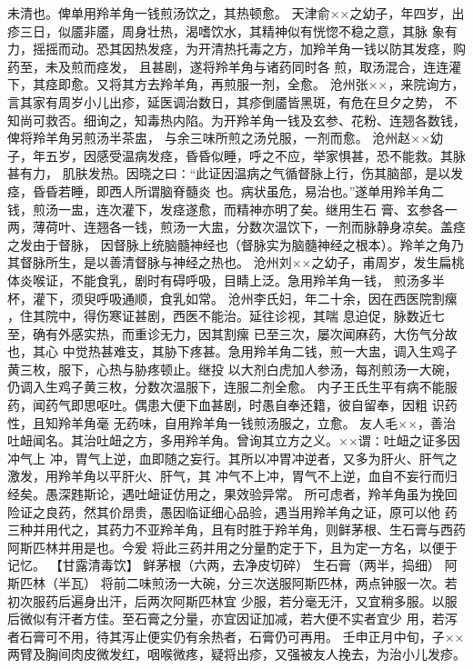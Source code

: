\documentclass[a4paper,12pt,UTF8,twoside]{ctexbook}
\begin{document}
未清也。俾单用羚羊角一钱煎汤饮之，其热顿愈。 
天津俞××之幼子，年四岁，出疹三日，似靥非靥，周身壮热，渴嗜饮水，其精神似有恍惚不稳之意，其脉 
象有力，摇摇而动。恐其因热发痉，为开清热托毒之方，加羚羊角一钱以防其发痉，购药至，未及煎而痉发， 
且甚剧，遂将羚羊角与诸药同时各 
煎，取汤混合，连连灌下，其痉即愈。又将其方去羚羊角，再煎服一剂，全愈。 
沧州张××，来院询方，言其家有周岁小儿出疹，延医调治数日，其疹倒靥皆黑斑，有危在旦夕之势， 
不知尚可救否。细询之，知毒热内陷。为开羚羊角一钱及玄参、花粉、连翘各数钱，俾将羚羊角另煎汤半茶盅， 
与余三味所煎之汤兑服，一剂而愈。 
沧州赵××幼子，年五岁，因感受温病发痉，昏昏似睡，呼之不应，举家惧甚，恐不能救。其脉甚有力， 
肌肤发热。因晓之曰∶“此证因温病之气循督脉上行，伤其脑部，是以发痉，昏昏若睡，即西人所谓脑脊髓炎 
也。病状虽危，易治也。”遂单用羚羊角二钱，煎汤一盅，连次灌下，发痉遂愈，而精神亦明了矣。继用生石 
膏、玄参各一两，薄荷叶、连翘各一钱，煎汤一大盅，分数次温饮下，一剂而脉静身凉矣。盖痉之发由于督脉， 
因督脉上统脑髓神经也（督脉实为脑髓神经之根本）。羚羊之角乃其督脉所生，是以善清督脉与神经之热也。 
沧州刘××之幼子，甫周岁，发生扁桃体炎喉证，不能食乳，剧时有碍呼吸，目睛上泛。急用羚羊角一钱， 
煎汤多半杯，灌下，须臾呼吸通顺，食乳如常。 
沧州李氏妇，年二十余，因在西医院割瘰 ，住其院中，得伤寒证甚剧，西医不能治。延往诊视，其喘 
息迫促，脉数近七至，确有外感实热，而重诊无力，因其割瘰 已至三次，屡次闻麻药，大伤气分故也，其心 
中觉热甚难支，其胁下疼甚。急用羚羊角二钱，煎一大盅，调入生鸡子黄三枚，服下，心热与胁疼顿止。继投 
以大剂白虎加人参汤，每剂煎汤一大碗，仍调入生鸡子黄三枚，分数次温服下，连服二剂全愈。 
内子王氏生平有病不能服药，闻药气即思呕吐。偶患大便下血甚剧，时愚自奉还籍，彼自留奉，因粗 
识药性，且知羚羊角毫 
无药味，自用羚羊角一钱煎汤服之，立愈。 
友人毛××，善治吐衄闻名。其治吐衄之方，多用羚羊角。曾询其立方之义。××谓∶吐衄之证多因冲气上 
冲，胃气上逆，血即随之妄行。其所以冲胃冲逆者，又多为肝火、肝气之激发，用羚羊角以平肝火、肝气，其 
冲气不上冲，胃气不上逆，血自不妄行而归经矣。愚深韪斯论，遇吐衄证仿用之，果效验异常。 
所可虑者，羚羊角虽为挽回险证之良药，然其价昂贵，愚因临证细心品验，遇当用羚羊角之证，原可以他 
药三种并用代之，其药力不亚羚羊角，且有时胜于羚羊角，则鲜茅根、生石膏与西药阿斯匹林并用是也。今爰 
将此三药并用之分量酌定于下，且为定一方名，以便于记忆。 
【甘露清毒饮】 
鲜茅根（六两，去净皮切碎） 生石膏（两半，捣细） 阿斯匹林（半瓦） 
将前二味煎汤一大碗，分三次送服阿斯匹林，两点钟服一次。若初次服药后遍身出汗，后两次阿斯匹林宜 
少服，若分毫无汗，又宜稍多服。以服后微似有汗者方佳。至石膏之分量，亦宜因证加减，若大便不实者宜少 
用，若泻者石膏可不用，待其泻止便实仍有余热者，石膏仍可再用。 
壬申正月中旬，子××两臂及胸间肉皮微发红，咽喉微疼，疑将出疹，又强被友人挽去，为治小儿发疹。 
\end{document}
